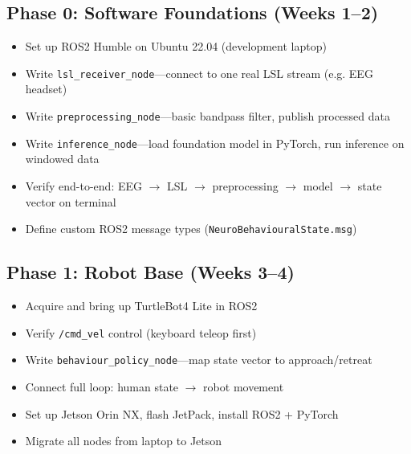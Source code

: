 \documentclass[11pt,a4paper]{article}
\begin{document}
\subsection{Phase 0: Software Foundations (Weeks 1--2)}

\begin{milestonebox}[title={Deliverable: Human wears EEG, state vector updates live on screen}]
\begin{itemize}[leftmargin=1.5em, nosep]
  \item Set up ROS2 Humble on Ubuntu 22.04 (development laptop)
  \item Write \texttt{lsl\_receiver\_node}---connect to one real LSL stream (e.g. EEG headset)
  \item Write \texttt{preprocessing\_node}---basic bandpass filter, publish processed data
  \item Write \texttt{inference\_node}---load foundation model in PyTorch, run inference on windowed data
  \item Verify end-to-end: EEG $\rightarrow$ LSL $\rightarrow$ preprocessing $\rightarrow$ model $\rightarrow$ state vector on terminal
  \item Define custom ROS2 message types (\texttt{NeuroBehaviouralState.msg})
\end{itemize}
\end{milestonebox}

\subsection{Phase 1: Robot Base (Weeks 3--4)}

\begin{milestonebox}[title={Deliverable: Robot physically moves in response to human brain state}]
\begin{itemize}[leftmargin=1.5em, nosep]
  \item Acquire and bring up TurtleBot4 Lite in ROS2
  \item Verify \texttt{/cmd\_vel} control (keyboard teleop first)
  \item Write \texttt{behaviour\_policy\_node}---map state vector to approach/retreat
  \item Connect full loop: human state $\rightarrow$ robot movement
  \item Set up Jetson Orin NX, flash JetPack, install ROS2 + PyTorch
  \item Migrate all nodes from laptop to Jetson
\end{itemize}
\end{milestonebox}
\end{document}
